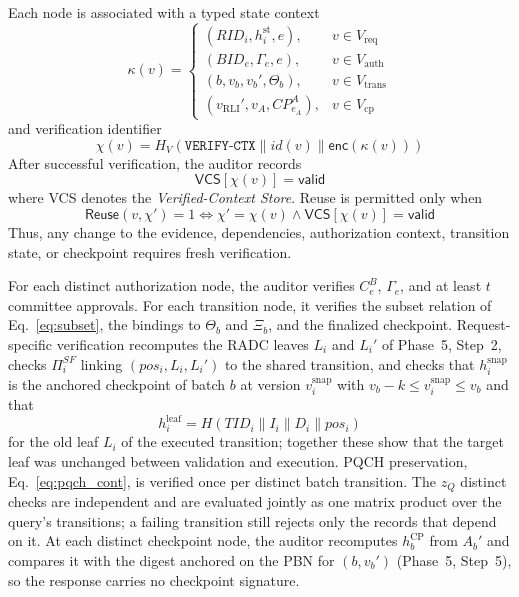 \documentclass[lettersize,journal]{IEEEtran}
\begin{document}
Each node is associated with a typed state context
\begin{equation}
\kappa(v)=
\begin{cases}
(RID_i,h_i^{\mathrm{st}},e),
&v\in V_{\mathrm{req}}\\
(BID_e,\Gamma_e,e),
&v\in V_{\mathrm{auth}}\\
(b,v_b,v_b',\Theta_b),
&v\in V_{\mathrm{trans}}\\
(v_{\mathrm{RLI}}',v_A,CP_{e_A}^A),
&v\in V_{\mathrm{cp}}
\end{cases}
\end{equation}
and verification identifier
\begin{equation}
\chi(v)=
H_V(
\texttt{VERIFY-CTX}\parallel
id(v)\parallel\mathsf{enc}(\kappa(v)))
\label{eq:chi}
\end{equation}
After successful verification, the auditor records
\begin{equation}
\mathsf{VCS}[\chi(v)]=\mathsf{valid}
\end{equation}
where VCS denotes the \emph{Verified-Context Store}. Reuse is permitted
only when
\begin{equation}
\mathsf{Reuse}(v,\chi')
=1
\Longleftrightarrow
\chi'=\chi(v)
\land
\mathsf{VCS}[\chi(v)]=\mathsf{valid}
\label{eq:saver_reuse}
\end{equation}
Thus, any change to the evidence, dependencies, authorization context,
transition state, or checkpoint requires fresh verification.

For each distinct authorization node, the auditor verifies $C_e^B$,
$\Gamma_e$, and at least $t$ committee approvals. For each transition
node, it verifies the subset relation of Eq.~\eqref{eq:subset}, the
bindings to $\Theta_b$ and $\Xi_b$, and the finalized checkpoint.
Request-specific verification recomputes the RADC leaves $L_i$ and
$L_i'$ of Phase~5, Step~2, checks $\Pi_i^{SF}$ linking
$(pos_i,L_i,L_i')$ to the shared transition, and checks that
$h_i^{\mathrm{snap}}$ is the anchored checkpoint of batch $b$ at version
$v_i^{\mathrm{snap}}$ with $v_b-k\le v_i^{\mathrm{snap}}\le v_b$ and that
\begin{equation}
h_i^{\mathrm{leaf}}=H(TID_i\parallel I_i\parallel D_i\parallel pos_i)
\end{equation}
for the old leaf $L_i$ of the executed transition;
together these show that the target leaf was unchanged between validation
and execution. PQCH preservation, Eq.~\eqref{eq:pqch_cont}, is
verified once per distinct batch transition.
The $z_Q$ distinct checks are independent and are
evaluated jointly as one matrix product over the query's transitions; a
failing transition still rejects only the records that depend on it. At
each distinct checkpoint node, the auditor recomputes $h_b^{\mathrm{CP}}$
from $A_b'$ and compares it with the digest anchored on the PBN for
$(b,v_b')$ (Phase~5, Step~5), so the response carries no checkpoint
signature.
\end{document}
